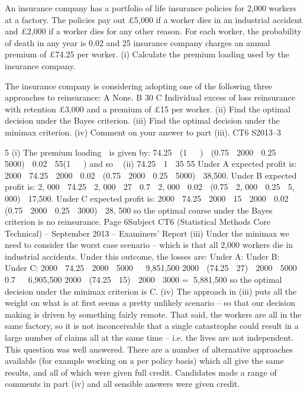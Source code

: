 \documentclass[a4paper,12pt]{article}
\begin{document}
An insurance company has a portfolio of life insurance policies for 2,000 workers at a
factory. The policies pay out £5,000 if a worker dies in an industrial accident and
£2,000 if a worker dies for any other reason. For each worker, the probability of
death in any year is 0.02 and 25%
insurance company charges an annual premium of £74.25 per worker.
(i)
Calculate the premium loading used by the insurance company.

The insurance company is considering adopting one of the following three approaches
to reinsurance:
A None.
B 30%
C Individual excess of loss reinsurance with retention £3,000 and a
premium of £15 per worker.
(ii) Find the optimal decision under the Bayes criterion. 
(iii) Find the optimal decision under the minimax criterion. 
(iv) Comment on your answer to part (iii).
CT6 S2013–3


\newpage



5
(i)
The premium loading  is given by:
74.25  (1   )  (0.75  2000  0.25  5000)  0.02  55(1   )
and so

(ii)
74.25
 1  35%
55
Under A expected profit is:
2000  74.25  2000  0.02  (0.75  2000  0.25  5000)
 38,500.
Under B expected profit is:
2, 000  74.25  2, 000  27  0.7  2, 000  0.02  (0.75  2, 000  0.25  5, 000)
 17,500.
Under C expected profit is:
2000  74.25  2000  15  2000  0.02  (0.75  2000  0.25  3000)
 28, 500
so the optimal course under the Bayes criterion is no reinsurance.
Page 6Subject CT6 (Statistical Methods Core Technical) – September 2013 – Examiners’ Report
(iii)
Under the minimax we need to consider the worst case scenario – which is that
all 2,000 workers die in industrial accidents.
Under this outcome, the losses are:
Under A:
Under B:
Under C:
2000  74.25  2000  5000   9,851,500
2000  (74.25  27)  2000  5000  0.7   6,905,500
2000  (74.25  15)  2000  3000 = 5,881,500
so the optimal decision under the minimax criterion is C.
(iv)
The approach in (iii) puts all the weight on what is at first seems a pretty
unlikely scenario – so that our decision making is driven by something fairly
remote.
That said, the workers are all in the same factory, so it is not inconceivable
that a single catastrophe could result in a large number of claims all at the
same time – i.e. the lives are not independent.
This question was well answered. There are a number of alternative approaches available
(for example working on a per policy basis) which all give the same results, and all of which
were given full credit. Candidates made a range of comments in part (iv) and all sensible
answers were given credit.
\end{document}
